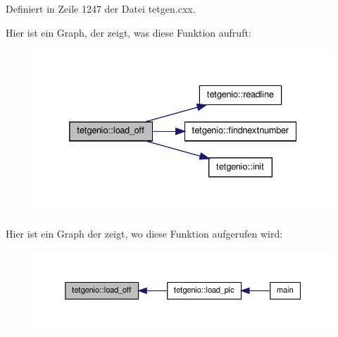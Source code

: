 Definiert in Zeile 1247 der Datei tetgen.\-cxx.



Hier ist ein Graph, der zeigt, was diese Funktion aufruft\-:\nopagebreak
\begin{figure}[H]
\begin{center}
\leavevmode
\includegraphics[width=332pt]{classtetgenio_a71c8e637cb420c3a87b648405df47abd_cgraph}
\end{center}
\end{figure}




Hier ist ein Graph der zeigt, wo diese Funktion aufgerufen wird\-:\nopagebreak
\begin{figure}[H]
\begin{center}
\leavevmode
\includegraphics[width=350pt]{classtetgenio_a71c8e637cb420c3a87b648405df47abd_icgraph}
\end{center}
\end{figure}


